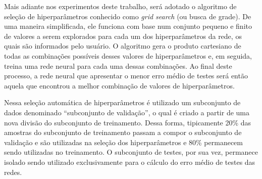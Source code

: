 Mais adiante nos experimentos deste trabalho, será adotado o algoritmo de seleção de hiperparâmetros conhecido como \textit{grid search} (ou busca de grade).
De uma maneira simplificada, ele funciona com base num conjunto pequeno e finito de valores a serem explorados para cada um dos hiperparâmetros da rede, os quais são informados pelo usuário.
O algoritmo gera o produto cartesiano de todas as combinações possíveis desses valores de hiperparâmetros e, em seguida, treina uma rede neural para cada uma dessas combinações.
Ao final deste processo, a rede neural que apresentar o menor erro médio de testes será então aquela que encontrou a melhor combinação de valores de hiperparâmetros.

Nessa seleção automática de hiperparâmetros é utilizado um subconjunto de dados denominado ``subconjunto de validação'', o qual é criado a partir de uma nova divisão do subconjunto de treinamento. Dessa forma, tipicamente 20\% das amostras do subconjunto de treinamento passam a compor o subconjunto de validação e são utilizadas na seleção dos hiperparâmetros e 80\% permanecem sendo utilizadas no treinamento.
O subconjunto de testes, por sua vez, permanece isolado sendo utilizado exclusivamente para o cálculo do erro médio de testes das redes.



